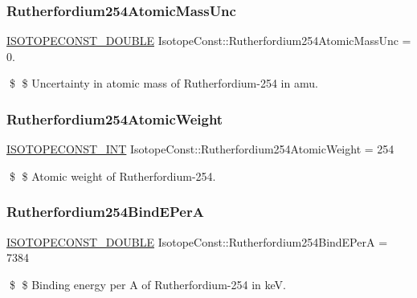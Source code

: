 \subsubsection{\texorpdfstring{Rutherfordium254\+Atomic\+Mass\+Unc}{Rutherfordium254AtomicMassUnc}}
{\footnotesize\ttfamily \mbox{\hyperlink{group___isotope_const-_macros_ga8f45a7272ce02c0b4c65c44636ed719a}{I\+S\+O\+T\+O\+P\+E\+C\+O\+N\+S\+T\+\_\+\+D\+O\+U\+B\+LE}} Isotope\+Const\+::\+Rutherfordium254\+Atomic\+Mass\+Unc = 0.}

\$ \$ Uncertainty in atomic mass of Rutherfordium-\/254 in amu. \mbox{\label{group___isotope_const-_rutherfordium-_rf254_ga43c9811e914f3656fd66da2078e02bdc}} 
\subsubsection{\texorpdfstring{Rutherfordium254\+Atomic\+Weight}{Rutherfordium254AtomicWeight}}
{\footnotesize\ttfamily \mbox{\hyperlink{group___isotope_const-_macros_ga5f18360b3e99483a35c32d789e62621c}{I\+S\+O\+T\+O\+P\+E\+C\+O\+N\+S\+T\+\_\+\+I\+NT}} Isotope\+Const\+::\+Rutherfordium254\+Atomic\+Weight = 254}

\$ \$ Atomic weight of Rutherfordium-\/254. \mbox{\label{group___isotope_const-_rutherfordium-_rf254_ga2b41b01c3dac710740a7985878cb8f0e}} 
\subsubsection{\texorpdfstring{Rutherfordium254\+Bind\+E\+PerA}{Rutherfordium254BindEPerA}}
{\footnotesize\ttfamily \mbox{\hyperlink{group___isotope_const-_macros_ga8f45a7272ce02c0b4c65c44636ed719a}{I\+S\+O\+T\+O\+P\+E\+C\+O\+N\+S\+T\+\_\+\+D\+O\+U\+B\+LE}} Isotope\+Const\+::\+Rutherfordium254\+Bind\+E\+PerA = 7384}

\$ \$ Binding energy per A of Rutherfordium-\/254 in keV. \mbox{\label{group___isotope_const-_rutherfordium-_rf254_ga48661515b23e6b5ee58fcb64ca0e362a}} 
